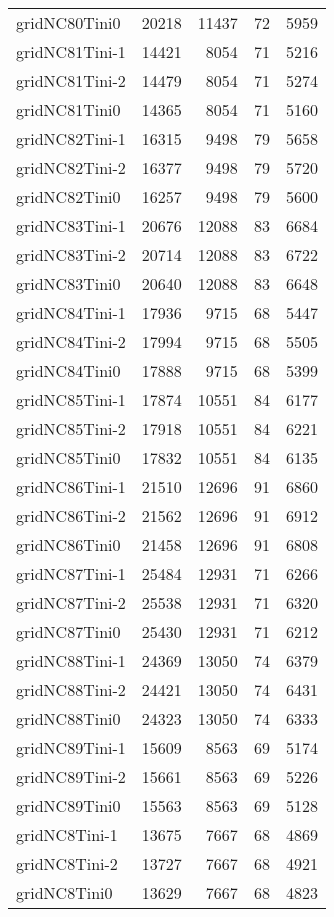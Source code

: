 \begin{longtable}{lrrrr}
gridNC80Tini0 & 20218 & 11437 & 72 & 5959 \\
gridNC81Tini-1 & 14421 & 8054 & 71 & 5216 \\
gridNC81Tini-2 & 14479 & 8054 & 71 & 5274 \\
gridNC81Tini0 & 14365 & 8054 & 71 & 5160 \\
gridNC82Tini-1 & 16315 & 9498 & 79 & 5658 \\
gridNC82Tini-2 & 16377 & 9498 & 79 & 5720 \\
gridNC82Tini0 & 16257 & 9498 & 79 & 5600 \\
gridNC83Tini-1 & 20676 & 12088 & 83 & 6684 \\
gridNC83Tini-2 & 20714 & 12088 & 83 & 6722 \\
gridNC83Tini0 & 20640 & 12088 & 83 & 6648 \\
gridNC84Tini-1 & 17936 & 9715 & 68 & 5447 \\
gridNC84Tini-2 & 17994 & 9715 & 68 & 5505 \\
gridNC84Tini0 & 17888 & 9715 & 68 & 5399 \\
gridNC85Tini-1 & 17874 & 10551 & 84 & 6177 \\
gridNC85Tini-2 & 17918 & 10551 & 84 & 6221 \\
gridNC85Tini0 & 17832 & 10551 & 84 & 6135 \\
gridNC86Tini-1 & 21510 & 12696 & 91 & 6860 \\
gridNC86Tini-2 & 21562 & 12696 & 91 & 6912 \\
gridNC86Tini0 & 21458 & 12696 & 91 & 6808 \\
gridNC87Tini-1 & 25484 & 12931 & 71 & 6266 \\
gridNC87Tini-2 & 25538 & 12931 & 71 & 6320 \\
gridNC87Tini0 & 25430 & 12931 & 71 & 6212 \\
gridNC88Tini-1 & 24369 & 13050 & 74 & 6379 \\
gridNC88Tini-2 & 24421 & 13050 & 74 & 6431 \\
gridNC88Tini0 & 24323 & 13050 & 74 & 6333 \\
gridNC89Tini-1 & 15609 & 8563 & 69 & 5174 \\
gridNC89Tini-2 & 15661 & 8563 & 69 & 5226 \\
gridNC89Tini0 & 15563 & 8563 & 69 & 5128 \\
gridNC8Tini-1 & 13675 & 7667 & 68 & 4869 \\
gridNC8Tini-2 & 13727 & 7667 & 68 & 4921 \\
gridNC8Tini0 & 13629 & 7667 & 68 & 4823 \\

\end{longtable}
